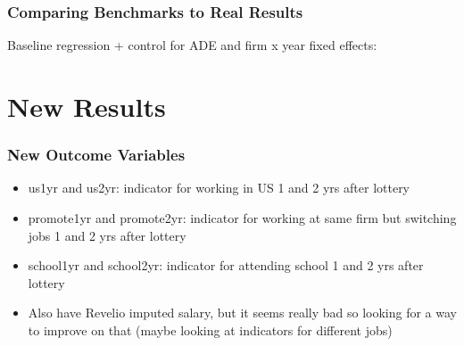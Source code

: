 \documentclass[xcolor=dvipsnames, compress, 12pt, aspectratio=169, handout]{beamer}
\begin{document}
\begin{frame}
    \frametitle{Comparing Benchmarks to Real Results}
    Baseline regression + control for ADE and firm x year fixed effects:
    \small
    \centering
{}

\end{frame}
\section{New Results}
\begin{frame}
    \frametitle{New Outcome Variables}
    \begin{itemize}
        \item us1yr and us2yr: indicator for working in US 1 and 2 yrs after lottery 
        \item promote1yr and promote2yr: indicator for working at same firm but switching jobs 1 and 2 yrs after lottery 
        \item school1yr and school2yr: indicator for attending school 1 and 2 yrs after lottery 
        \item Also have Revelio imputed salary, but it seems really bad so looking for a way to improve on that (maybe looking at indicators for different jobs)
    \end{itemize}
\end{frame}
\end{document}
